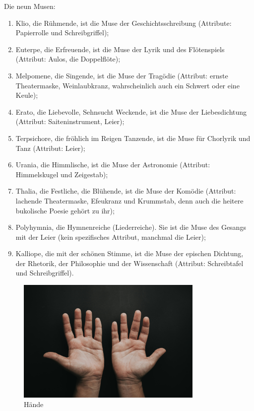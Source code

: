 \documentclass[a4paper]{amsart}
\theoremstyle{definition}
\begin{document}
Die neun Musen:
\begin{enumerate}
   \item Klio, die Rühmende, ist die Muse der Geschichtsschreibung (Attribute: Papierrolle und Schreibgriffel);
   \item Euterpe, die Erfreuende, ist die Muse der Lyrik und des Flötenspiels (Attribut: Aulos, die Doppelflöte);
   \item Melpomene, die Singende, ist die Muse der Tragödie (Attribut: ernste Theatermaske, Weinlaubkranz, wahrscheinlich auch ein Schwert oder eine Keule);
   \item Erato, die Liebevolle, Sehnsucht Weckende, ist die Muse der Liebesdichtung (Attribut: Saiteninstrument, Leier);
   \item Terpsichore, die fröhlich im Reigen Tanzende, ist die Muse für Chorlyrik und Tanz (Attribut: Leier);
   \item Urania, die Himmlische, ist die Muse der Astronomie (Attribut: Himmelskugel und Zeigestab);
   \item Thalia, die Festliche, die Blühende, ist die Muse der Komödie (Attribut: lachende Theatermaske, Efeukranz und Krummstab, denn auch die heitere bukolische Poesie gehört zu ihr);
   \item Polyhymnia, die Hymnenreiche (Liederreiche). Sie ist die Muse des Gesangs mit der Leier (kein spezifisches Attribut, manchmal die Leier);
   \item Kalliope, die mit der schönen Stimme, ist die Muse der epischen Dichtung, der Rhetorik, der Philosophie und der Wissenschaft (Attribut: Schreibtafel und Schreibgriffel).
\end{enumerate}

\begin{figure}
   \includegraphics[height=6cm]{zehnFinger luis-quintero-qKspdY9XUzs-unsplash.jpg}
   \caption{Hände}
\end{figure}
\end{document}

